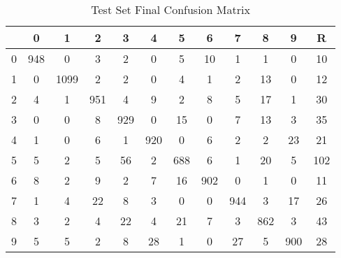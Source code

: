 \documentclass[a4paper, 11pt, wide]{article}
\begin{document}
   \begin{table}[H]
  \begin{center}
  \begin{tabular}{ |c|c c c c c c c c c c|c| } 
  \hline
   & 0 & 1 & 2 & 3 & 4 & 5 & 6 & 7 & 8 & 9 & R\\ 
  \hline
	 0 & 948 & 0 & 3 & 2 & 0 & 5 & 10 & 1 & 1 & 0 & 10 \\
	 1 & 0 & 1099 & 2 & 2 & 0 & 4 & 1 & 2 & 13 & 0 & 12 \\
	 2 & 4 & 1 & 951 & 4 & 9 & 2 & 8 & 5 & 17 & 1 & 30 \\
	 3 & 0 & 0 & 8 & 929 & 0 & 15 & 0 & 7 & 13 & 3 & 35 \\
	 4 & 1 & 0 & 6 & 1 & 920 & 0 & 6 & 2 & 2 & 23 & 21 \\
	 5 & 5 & 2 & 5 & 56 & 2 & 688 & 6 & 1 & 20 & 5 & 102 \\
	 6 & 8 & 2 & 9 & 2 & 7 & 16 & 902 & 0 & 1 & 0 & 11 \\
	 7 & 1 & 4 & 22 & 8 & 3 & 0 & 0 & 944 & 3 & 17 & 26 \\
	 8 & 3 & 2 & 4 & 22 & 4 & 21 & 7 & 3 & 862 & 3 & 43 \\
	 9 & 5 & 5 & 2 & 8 & 28 & 1 & 0 & 27 & 5 & 900 & 28 \\
   \hline
  \end{tabular}
  \end{center}
  \caption{Test Set Final Confusion Matrix}
  \end{table}
\end{document}
